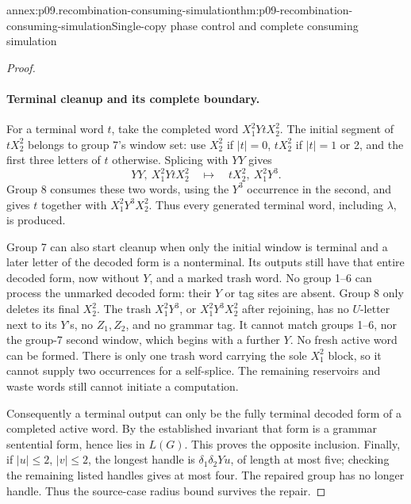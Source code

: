 \begin{annexitem}{annex:p09.recombination-consuming-simulation}{thm:p09-recombination-consuming-simulation}{Single-copy phase control and complete consuming simulation}
\begin{proof}
\paragraph{Terminal cleanup and its complete boundary.}
For a terminal word \(t\), take the completed word \(X_1^2YtX_2^2\).
The initial segment of \(tX_2^2\) belongs to group 7's window set:
use \(X_2^2\) if \(|t|=0\), \(tX_2^2\) if \(|t|=1\) or 2,
and the first three letters of \(t\) otherwise.
Splicing with \(YY\) gives
\[
 YY,\ X_1^2YtX_2^2
 \quad\longmapsto\quad tX_2^2,\ X_1^2Y^3.
\]
Group 8 consumes these two words, using the \(Y^3\) occurrence in the
second, and gives \(t\) together with \(X_1^2Y^3X_2^2\).
Thus every generated terminal word, including \(\lambda\), is produced.

Group 7 can also start cleanup when only the initial window is terminal
and a later letter of the decoded form is a nonterminal. Its outputs still
have that entire decoded form, now without \(Y\), and a marked trash word.
No group 1--6 can process the unmarked decoded form: their \(Y\) or
tag sites are absent. Group 8 only deletes its final \(X_2^2\).
The trash \(X_1^2Y^3\), or \(X_1^2Y^3X_2^2\) after rejoining, has no
\(U\)-letter next to its \(Y\)'s, no \(Z_1,Z_2\), and no grammar tag.
It cannot match groups 1--6, nor the group-7 second window, which begins
with a further \(Y\). No fresh active word can be formed. There is only
one trash word carrying the sole \(X_1^2\) block, so it cannot supply
two occurrences for a self-splice. The remaining reservoirs and waste words
still cannot initiate a computation.

Consequently a terminal output can only be the fully terminal decoded
form of a completed active word. By the established invariant that form
is a grammar sentential form, hence lies in \(L(G)\). This proves the
opposite inclusion. Finally, if \(|u|\leq2\), \(|v|\leq2\), the longest
handle is \(\delta_1\delta_2Yu\), of length at most five; checking the
remaining listed handles gives at most four. The repaired group has no
longer handle. Thus the source-case radius bound survives the repair.
\end{proof}
\end{annexitem}

